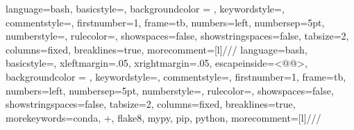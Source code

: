 		{
				language=bash,
				basicstyle=\footnotesize\ttfamily, %
				backgroundcolor = \color{mysticlight}, %
				keywordstyle=\color{vbablue},   %
				commentstyle=\color{vbagreen},  %
				firstnumber=1,                	%
				frame=tb,	                	%
				numbers=left,                   %
				numbersep=5pt,                  %
				numberstyle=\tiny\color{gray},	%
				rulecolor=\color{black},        %
				showspaces=false,               %
				showstringspaces=false,         %
				tabsize=2,		                %
				columns=fixed,					%
				breaklines=true,				%
				morecomment=[l]{///}				%
		}
		{
				language=bash,
				basicstyle=\color{white}\footnotesize\ttfamily, %
				xleftmargin=.05\textwidth,
				xrightmargin=.05\textwidth,
				escapeinside={<@}{@>},
				backgroundcolor = \color{black}, %
				keywordstyle=\color{yellow},   %
				commentstyle=\color{vbagreen},  %
				firstnumber=1,                	%
				frame=tb,	                	%
				numbers=left,                   %
				numbersep=5pt,                  %
				numberstyle=\tiny\color{gray},	%
				rulecolor=\color{black},        %
				showspaces=false,               %
				showstringspaces=false,         %
				tabsize=2,		                %
				columns=fixed,					%
				breaklines=true,				%
				morekeywords={conda, +, flake8, mypy, pip, python},		%
				morecomment=[l]{///}			%
		}
